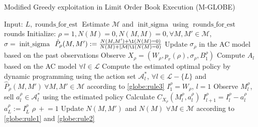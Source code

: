             \begin{algorithm}
                \caption[Modified GLOBE Algorithm]{Modified Greedy exploitation in Limit Order Book Execution (M-GLOBE)}
                \begin{algorithmic}
                    \State Input: $L, \operatorname{rounds\_for\_est}$
                    \State Estimate $\mathcal{M}$ and $\operatorname{init\_sigma}$ using $\operatorname{rounds\_for\_est}$ rounds
                    \State Initialize: $\rho = 1, N(M)=0, N(M,M)=0, \forall M, M' \in \mathcal{M}$, $\sigma = \operatorname{init\_sigma}$
                        \State $\hat P_\rho (M, M') := \frac{N(M, M') + \1(N(M) = 0)}{N(M) + |\mathcal M| \1 (N(M) = 0)}$
                        \State Update $\sigma_\rho$ in the AC model based on the past observations
                        \State Observe $X_\rho = (W_\rho, p_r(\rho), \sigma_\rho, B_1^\rho)$
                        \State Compute $A_l$ based on the AC model $\forall l \in \mathcal{L}$
                        \State Compute the estimated optimal policy by dynamic programming using the action set $\mathcal A_l^*$, $\forall l \in \mathcal{L} - \{L\}$ and $\hat P_\rho (M, M')\ \forall M, M' \in \mathcal M$ according to \eqref{globe:rule3}
                        \State $I_1^\rho = W_\rho$, $l=1$
                            \State Observe $M_l^\rho$, sell $a_l^\rho\in \mathcal{A}^*_l$ using the estimated policy
                            \State Calculate $C_{X_\rho}(M_l^\rho, a_l^\rho)$
                            \State $I_{l+1}^\rho = I_l^\rho - a_l^\rho$
                        \EndFor
                        \State $a_{L}^\rho := I_L^\rho$
                        \State $\rho\ +\!\!= 1$
                        \State Update $N(M, M')$ and $N(M)$ $\forall M \in \mathcal{M}$ according to \eqref{globe:rule1} and \eqref{globe:rule2}
                    \EndWhile
                \end{algorithmic}
                \label{algorithm:MGLOBE}
            \end{algorithm}


